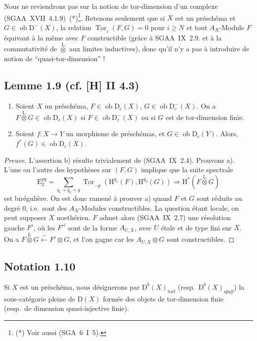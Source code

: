 \documentclass[11pt]{article}
\renewcommand{\H}{\mathrm{H}}
\DeclareMathOperator{\Tor}{Tor}
\newcommand{\D}{\mathrm{D}}
\newcommand{\E}{\mathrm{E}}
\newcommand{\ob}{\operatorname{ob}}
\providecommand{\ob}{\operatorname{ob}}
\begin{document}
Nous ne reviendrons pas sur la notion de tor-dimension d'un complexe (SGAA~XVII~4.1.9)~(*)\footnote{(*) Voir aussi (SGA~6~I~5).}. Retenons seulement que si $X$ est un préschéma et $G \in \ob \D^{-}(X)$, la relation $\underline{\Tor}_i(F,G) = 0$ pour $i \geqslant N$ et tout $A_X$-Module $F$ équivaut à la même avec $F$ constructible (grâce à SGAA~IX~2.9. et à la commutativité de $\mathop{\otimes}\limits^{\mathrm{L}}$ aux limites inductives), donc qu'il n'y a pas à introduire de notion de ``quasi-tor-dimension'' !

\subsection*{Lemme 1.9 (cf. [H] II 4.3)}
\begin{enumerate}
\item[a)] Soient $X$ un préschéma, $F \in \ob \D_c(X)$, $G \in \ob \D_c^{-}(X)$. On a $F \mathop{\otimes}\limits^{\mathrm{L}} G \in \ob \D_c(X)$ si $F \in \ob \D_c^{-}(X)$ ou si $G$ est de tor-dimension finie.
\item[b)] Soient $f : X \to Y$ un morphisme de préschémas, et $G \in \ob \D_c(Y)$. Alors, $f^{*}(G) \in \ob \D_c(X)$.
\end{enumerate}

\begin{proof}[Preuve]
L'assertion b) résulte trivialement de (SGAA~IX~2.4). Prouvons a). L'une ou l'autre des hypothèses sur $(F,G)$ implique que la suite spectrale
\[
\E_2^{pq} = \sum_{q_1+q_2=q} \underline{\Tor}_{-p}(\H^{q_1}(F), \H^{q_2}(G)) \Rightarrow \H^{*}(F \mathop{\otimes}\limits^{\mathrm{L}} G)
\]
est birégulière. On est donc ramené à prouver a) quand $F$ et $G$ sont réduits au degré $0$, i.e.~sont des $A_X$-Modules constructibles. La question étant locale, on peut supposer $X$ noethérien. $F$ admet alors (SGAA~IX~2.7) une résolution gauche $F'$, où les $F'^i$ sont de la forme $A_{U,X}$, avec $U$ étale et de type fini sur $X$. On a $F \mathop{\otimes}\limits^{\mathrm{L}} G \xleftarrow{\sim} F' \otimes G$, et l'on gagne car les $A_{U,X} \otimes G$ sont constructibles.
\end{proof}

\subsection*{Notation 1.10}
Si $X$ est un préschéma, nous désignerons par $\D^{b}(X)_{\mathrm{torf}}$ (resp.~$\D^{b}(X)_{\mathrm{qinjf}}$) la sous-catégorie pleine de $\D(X)$ formée des objets de tor-dimension finie (resp.~de dimension quasi-injective finie).
\end{document}
